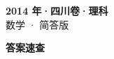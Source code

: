 \documentclass[zihao=-4, a4paper]{ctexart}
\begin{document}
\begin{center}
  {\Large\bfseries 2014 年·四川卷·理科}\\[4pt]
  {\large 数学 · 简答版}
\end{center}
\medskip
{}

\clearpage
{}
\begin{center}{\Large\bfseries 答案速查}\end{center}
\medskip

\end{document}
